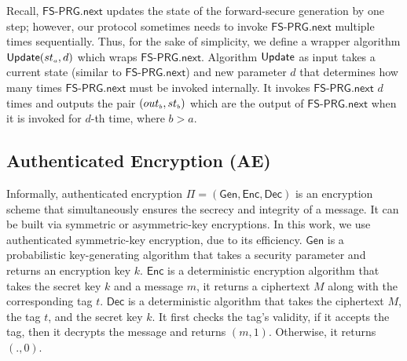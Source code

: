 Recall, $\mathsf{FS\text{-}PRG.next}$ updates the state of the forward-secure generation by one step; however, our protocol sometimes needs to invoke $\mathsf{FS\text{-}PRG.next}$ multiple times sequentially. Thus, for the sake of simplicity, we define a wrapper algorithm $ \mathsf{Update}({st}_{\scriptscriptstyle a}, d)$ which wraps  $\mathsf{FS\text{-}PRG.next}$. Algorithm $\mathsf{Update}$  as input takes a current state (similar to $\mathsf{FS\text{-}PRG.next}$) and new parameter $d$ that determines how many times   $\mathsf{FS\text{-}PRG.next}$ must be invoked internally. It invokes  $\mathsf{FS\text{-}PRG.next}$ $d$ times and outputs the pair  $({out}_{\scriptscriptstyle b}, {st}_{\scriptscriptstyle b})$  which are the output of $\mathsf{FS\text{-}PRG.next}$ when it is invoked for $d$-th time, where $ b> a$. 




 
\subsection{Authenticated Encryption (AE)} 

Informally, authenticated encryption $\Pi=(\mathsf{Gen}, \mathsf{Enc}, \mathsf{Dec})$ is an encryption scheme that simultaneously ensures the secrecy and integrity of a message. It can be built via symmetric or asymmetric-key encryptions. In this work, we use authenticated symmetric-key encryption, due to its efficiency. $\mathsf{Gen}$ is a probabilistic key-generating algorithm that takes a security parameter and returns an encryption key $k$. $\mathsf{Enc}$ is a deterministic encryption algorithm that takes the secret key $k$ and a message $m$, it returns a ciphertext $M$ along with the corresponding tag $t$. $\mathsf{Dec}$ is a deterministic algorithm that takes the ciphertext $M$, the tag $t$, and the secret key $k$. It first checks the tag's validity, if it accepts the tag, then it decrypts the message and returns $(m,1)$. Otherwise, it returns $(.,0)$. 


